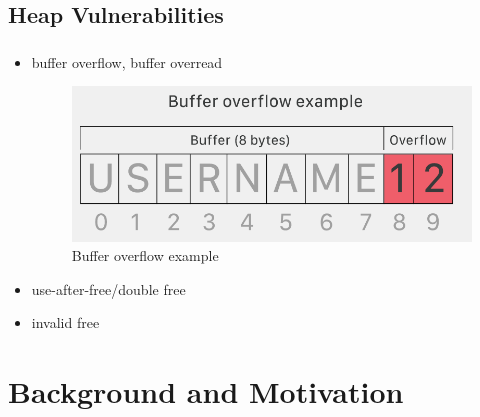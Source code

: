 \documentclass{beamer}
\begin{document}
\subsection{Heap Vulnerabilities}
\begin{frame}
		\frametitle{\secname}
    \framesubtitle{\subsecname}
    \begin{itemize}
      \item buffer overflow, buffer overread
          \begin{figure}
              \centering
              \includegraphics[scale=0.3]{buffer_overflow}
              \\Buffer overflow example
          \end{figure}
      \item use-after-free/double free
      \item invalid free
    \end{itemize}
\end{frame}

\section{Background and Motivation}
\end{document}
